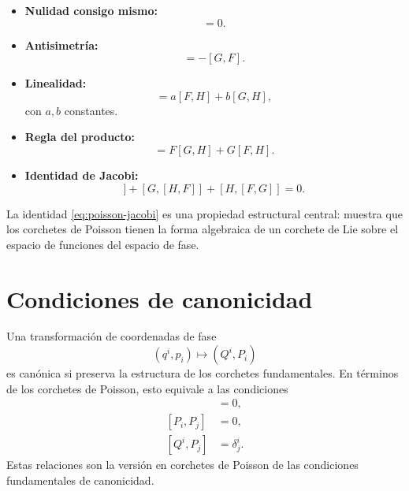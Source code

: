 \documentclass[../apunte_mecanica_clasica.tex]{subfiles}
\begin{document}
\begin{itemize}
    \item \textbf{Nulidad consigo mismo:}
    \begin{equation}
        [F,F]=0.
        \label{eq:poisson-nulo}
    \end{equation}

    \item \textbf{Antisimetría:}
    \begin{equation}
        [F,G]=-[G,F].
        \label{eq:poisson-antisym}
    \end{equation}

    \item \textbf{Linealidad:}
    \begin{equation}
        [aF+bG,H]=a[F,H]+b[G,H],
        \label{eq:poisson-linealidad}
    \end{equation}
    con $a,b$ constantes.

    \item \textbf{Regla del producto:}
    \begin{equation}
        [FG,H]=F[G,H]+G[F,H].
        \label{eq:poisson-producto}
    \end{equation}

    \item \textbf{Identidad de Jacobi:}
    \begin{equation}
        [F,[G,H]]+[G,[H,F]]+[H,[F,G]]=0.
        \label{eq:poisson-jacobi}
    \end{equation}
\end{itemize}

La identidad \eqref{eq:poisson-jacobi} es una propiedad estructural central: muestra que los corchetes de Poisson tienen la forma algebraica de un corchete de Lie sobre el espacio de funciones del espacio de fase.

\section{Condiciones de canonicidad}

Una transformación de coordenadas de fase
\begin{equation}
    (q^i,p_i) \longmapsto (Q^i,P_i)
    \label{eq:transformacion-fase-general}
\end{equation}
es canónica si preserva la estructura de los corchetes fundamentales. En términos de los corchetes de Poisson, esto equivale a las condiciones
\begin{align}
    [Q^i,Q^j] &= 0,
    \label{eq:cond-canonica-qq} \\
    [P_i,P_j] &= 0,
    \label{eq:cond-canonica-pp} \\
    [Q^i,P_j] &= \delta^i_j.
    \label{eq:cond-canonica-qp}
\end{align}
Estas relaciones son la versión en corchetes de Poisson de las condiciones fundamentales de canonicidad.
\end{document}
